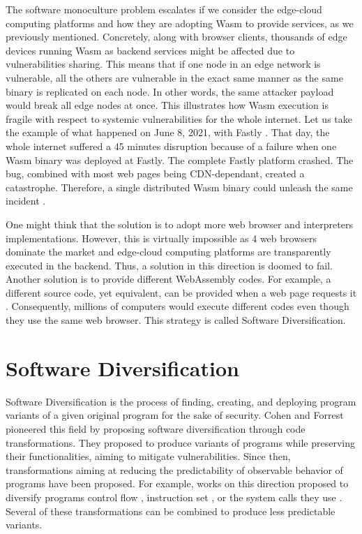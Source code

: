 The software monoculture problem escalates if we consider the edge-cloud computing platforms and how they are adopting Wasm to provide services, as we previously mentioned.
Concretely, along with browser clients, thousands of edge devices running Wasm as backend services might be affected due to vulnerabilities sharing.
This means that if one node in an edge network is vulnerable, all the others are vulnerable in the exact same manner as the same binary is replicated on each node. In other words, the same attacker payload would break all edge nodes at once.
This illustrates how Wasm execution is fragile with respect to systemic vulnerabilities for the whole internet.
Let us take the example of what happened on June 8, 2021, with Fastly \cite{BREAKFastly}.
That day, the whole internet suffered a 45 minutes disruption because of a failure when one Wasm binary was deployed at Fastly.
The complete Fastly platform crashed.
The bug, combined with most web pages being CDN-dependant, created a catastrophe.
Therefore, a single distributed Wasm binary could unleash the same incident \cite{CVE}.

One might think that the solution is to adopt more web browser and interpreters implementations. 
However, this is virtually impossible as 4 web browsers dominate the market and edge-cloud computing platforms are transparently executed in the backend.
Thus, a solution in this direction is doomed to fail. 
Another solution is to provide different WebAssembly codes.
For example, a different source code, yet equivalent, can be provided when a web page requests it \cite{CROW}. 
Consequently, millions of computers would execute different codes even though they use the same web browser.
This strategy is called Software Diversification.
 
\section{Software Diversification}

Software Diversification is the process of finding, creating, and deploying program variants of a given original program \cite{okhravi2013survey} for the sake of security.
Cohen \etal \cite{cohen1993operating} and Forrest \etal \cite{595185} pioneered this field by proposing software diversification through code transformations. 
They proposed to produce variants of programs while preserving their functionalities, aiming to mitigate vulnerabilities.
Since then, transformations aiming at reducing the predictability of observable behavior of programs have been proposed. For example, works on this direction proposed to diversify programs control flow \cite{davi2015isomeron}, instruction set \cite{barrantes2003randomized}, or the system calls they use \cite{Chew02mitigatingbuffer}. 
Several of these transformations can be combined to produce less predictable variants.

